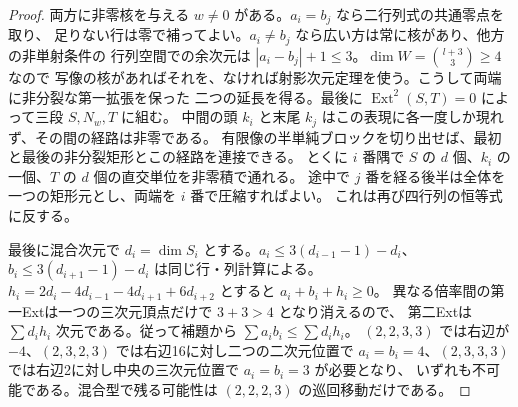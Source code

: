 \begin{proof}
両方に非零核を与える $w\ne0$ がある。$a_i=b_j$ なら二行列式の共通零点を取り、
足りない行は零で補ってよい。$a_i\ne b_j$ なら広い方は常に核があり、他方の非単射条件の
行列空間での余次元は $|a_i-b_j|+1\le3$。$\dim W=\binom{l+3}3\ge4$ なので
写像の核があればそれを、なければ射影次元定理を使う。こうして両端に非分裂な第一拡張を保った
二つの延長を得る。最後に $\operatorname{Ext}^2(S,T)=0$ によって三段 $S,N_w,T$ に組む。
中間の頭 $k_i$ と末尾 $k_j$ はこの表現に各一度しか現れず、その間の経路は非零である。
有限像の半単純ブロックを切り出せば、最初と最後の非分裂矩形とこの経路を連接できる。
とくに $i$ 番隅で $S$ の $d$ 個、$k_i$ の一個、$T$ の $d$ 個の直交単位を非零積で通れる。
途中で $j$ 番を経る後半は全体を一つの矩形元とし、両端を $i$ 番で圧縮すればよい。
これは再び四行列の恒等式に反する。

最後に混合次元で $d_i=\dim S_i$ とする。$a_i\le3(d_{i-1}-1)-d_i$、
$b_i\le3(d_{i+1}-1)-d_i$ は同じ行・列計算による。
$h_i=2d_i-4d_{i-1}-4d_{i+1}+6d_{i+2}$ とすると $a_i+b_i+h_i\ge0$。
異なる倍率間の第一Extは一つの三次元頂点だけで $3+3>4$ となり消えるので、
第二Extは $\sum d_i h_i$ 次元である。従って補題から $\sum a_i b_i\le\sum d_i h_i$。
$(2,2,3,3)$ では右辺が $-4$、$(2,3,2,3)$ では右辺16に対し二つの二次元位置で
$a_i=b_i=4$、$(2,3,3,3)$ では右辺2に対し中央の三次元位置で $a_i=b_i=3$ が必要となり、
いずれも不可能である。混合型で残る可能性は $(2,2,2,3)$ の巡回移動だけである。
\end{proof}

